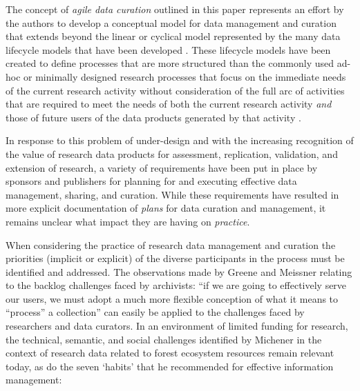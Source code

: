 \documentclass[paper]{ijdc-v9}
\begin{document}
The concept of \emph{agile data curation} outlined in this paper
represents an effort by the authors to develop a conceptual model for
data management and curation that extends beyond the linear or cyclical
model represented by the many data lifecycle models that have been
developed
\autocites{ball_review_2012}{park_session_2016}{moller_lifecycle_2013}{working_group_on_information_systems_and_services_data_data_stewardship_interest_group_data_2011}.
These lifecycle models have been created to define processes that are
more structured than the commonly used ad-hoc or minimally designed
research processes that focus on the immediate needs of the current
research activity without consideration of the full arc of activities
that are required to meet the needs of both the current research
activity \emph{and} those of future users of the data products generated
by that activity
\autocites{kervin_common_2013}{white_considering_2010}{tenopir_data_2011}{akers_disciplinary_2013}{kennan_research_2015}{vines_availability_2014}.

In response to this problem of under-design and with the increasing
recognition of the value of research data products for assessment,
replication, validation, and extension of research, a variety of
requirements have been put in place by sponsors
\autocites{office_of_management_and_budget_omb_digital_2012}{office_of_management_and_budget_omb_memorandum_2013}{office_of_management_and_budget_omb_memorandum_2009}{obama_77_2012}{obama_executive_2013}{obama_transparency_2009}
and publishers \autocites{_availability_2016}[
]{public_library_of_science_plos_data_2016} for planning for and
executing effective data management, sharing, and curation. While these
requirements have resulted in more explicit documentation of
\emph{plans} for data curation and management, it remains unclear what
impact they are having on \emph{practice}.

When considering the practice of research data management and curation
the priorities (implicit or explicit) of the diverse participants in the
process must be identified and addressed. The observations made by
Greene and Meissner \autocite*{greene_more_2005} relating to the backlog
challenges faced by archivists: ``if we are going to effectively serve
our users, we must adopt a much more flexible conception of what it
means to ``process'' a collection'' \autocite[pp.~233]{greene_more_2005}
can easily be applied to the challenges faced by researchers and data
curators. In an environment of limited funding for research, the
technical, semantic, and social challenges identified by Michener
\autocite*{michener_role_1999} in the context of research data related
to forest ecosystem resources remain relevant today, as do the seven
`habits' that he recommended for effective information management:
\end{document}
